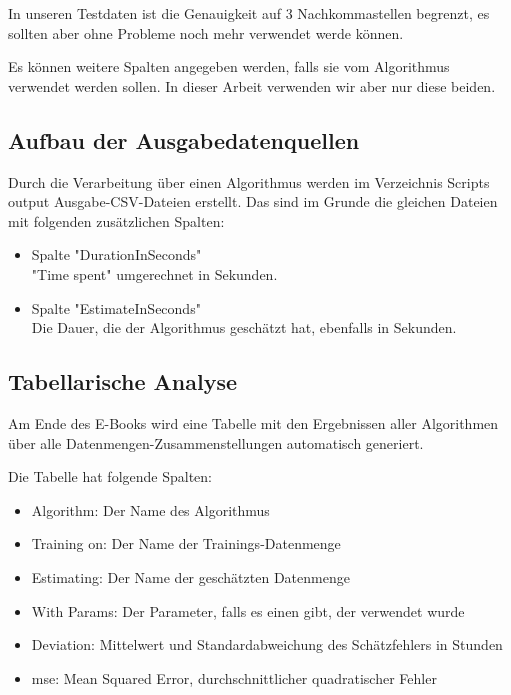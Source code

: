 In unseren Testdaten ist die Genauigkeit auf 3 Nachkommastellen begrenzt, 
es sollten aber ohne Probleme noch mehr verwendet werde können.

Es können weitere Spalten angegeben werden, falls sie vom Algorithmus verwendet werden sollen. In dieser Arbeit verwenden wir aber nur diese beiden. 

\subsection{Aufbau der Ausgabedatenquellen}

Durch die Verarbeitung über einen Algorithmus werden im Verzeichnis Scripts\\output Ausgabe-CSV-Dateien erstellt. Das sind im Grunde die gleichen Dateien mit folgenden zusätzlichen Spalten:

\begin{itemize}
  \item Spalte "DurationInSeconds"\\ 
        "Time spent" umgerechnet in Sekunden.
  \item Spalte "EstimateInSeconds"\\ 
        Die Dauer, die der Algorithmus geschätzt hat, ebenfalls in Sekunden.
\end{itemize}

\subsection{Tabellarische Analyse}

Am Ende des E-Books wird eine Tabelle mit den Ergebnissen aller Algorithmen über alle Datenmengen-Zusammenstellungen automatisch generiert.

Die Tabelle hat folgende Spalten:

\begin{itemize}
    \item Algorithm: Der Name des Algorithmus
    \item Training on: Der Name der Trainings-Datenmenge
    \item Estimating: Der Name der geschätzten Datenmenge
    \item With Params: Der Parameter, falls es einen gibt, der verwendet wurde
    \item Deviation: Mittelwert und Standardabweichung des Schätzfehlers in Stunden
    \item mse: Mean Squared Error, durchschnittlicher quadratischer Fehler
\end{itemize}

